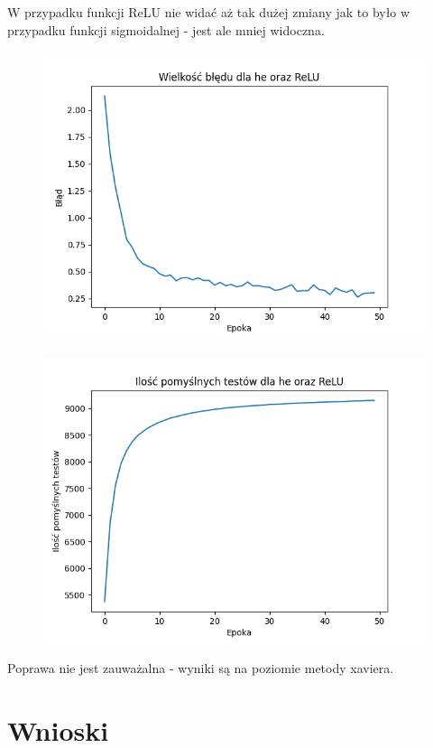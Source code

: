 \documentclass{article}
\begin{document}
W przypadku funkcji ReLU nie widać aż tak dużej zmiany jak to było w przypadku funkcji sigmoidalnej - jest ale mniej widoczna.

\newpage
\begin{figure}[!htb]
  \centering
  \includegraphics[width=\linewidth]{error_he_ReLU.png}
\end{figure}

\begin{figure}[!htb]
  \centering
  \includegraphics[width=\linewidth]{test_he_ReLU.png}
\end{figure}

Poprawa nie jest zauważalna - wyniki są na poziomie metody xaviera.

\section{Wnioski}
\end{document}
